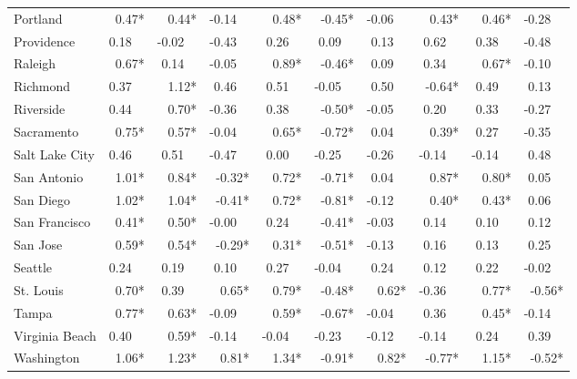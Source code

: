 \begin{tabular}{lrrrrrrrrr}
	Portland       &  0.47* &   0.44* & -0.14~~ &   0.48* &  -0.45* & -0.06~~ &   0.43* &   0.46* & -0.28~~ \\
	Providence     & 0.18~~ & -0.02~~ & -0.43~~ &  0.26~~ &  0.09~~ &  0.13~~ &  0.62~~ &  0.38~~ & -0.48~~ \\
	Raleigh        &  0.67* &  0.14~~ & -0.05~~ &   0.89* &  -0.46* &  0.09~~ &  0.34~~ &   0.67* & -0.10~~ \\
	Richmond       & 0.37~~ &   1.12* &  0.46~~ &  0.51~~ & -0.05~~ &  0.50~~ &  -0.64* &  0.49~~ &  0.13~~ \\
	Riverside      & 0.44~~ &   0.70* & -0.36~~ &  0.38~~ &  -0.50* & -0.05~~ &  0.20~~ &  0.33~~ & -0.27~~ \\
	Sacramento     &  0.75* &   0.57* & -0.04~~ &   0.65* &  -0.72* &  0.04~~ &   0.39* &  0.27~~ & -0.35~~ \\
	Salt Lake City & 0.46~~ &  0.51~~ & -0.47~~ &  0.00~~ & -0.25~~ & -0.26~~ & -0.14~~ & -0.14~~ &  0.48~~ \\
	San Antonio    &  1.01* &   0.84* &  -0.32* &   0.72* &  -0.71* &  0.04~~ &   0.87* &   0.80* &  0.05~~ \\
	San Diego      &  1.02* &   1.04* &  -0.41* &   0.72* &  -0.81* & -0.12~~ &   0.40* &   0.43* &  0.06~~ \\
	San Francisco  &  0.41* &   0.50* & -0.00~~ &  0.24~~ &  -0.41* & -0.03~~ &  0.14~~ &  0.10~~ &  0.12~~ \\
	San Jose       &  0.59* &   0.54* &  -0.29* &   0.31* &  -0.51* & -0.13~~ &  0.16~~ &  0.13~~ &  0.25~~ \\
	Seattle        & 0.24~~ &  0.19~~ &  0.10~~ &  0.27~~ & -0.04~~ &  0.24~~ &  0.12~~ &  0.22~~ & -0.02~~ \\
	St. Louis      &  0.70* &  0.39~~ &   0.65* &   0.79* &  -0.48* &   0.62* & -0.36~~ &   0.77* &  -0.56* \\
	Tampa          &  0.77* &   0.63* & -0.09~~ &   0.59* &  -0.67* & -0.04~~ &  0.36~~ &   0.45* & -0.14~~ \\
	Virginia Beach & 0.40~~ &   0.59* & -0.14~~ & -0.04~~ & -0.23~~ & -0.12~~ & -0.14~~ &  0.24~~ &  0.39~~ \\
	Washington     &  1.06* &   1.23* &   0.81* &   1.34* &  -0.91* &   0.82* &  -0.77* &   1.15* &  -0.52* \\ \bottomrule
\end{tabular}
\normalsize